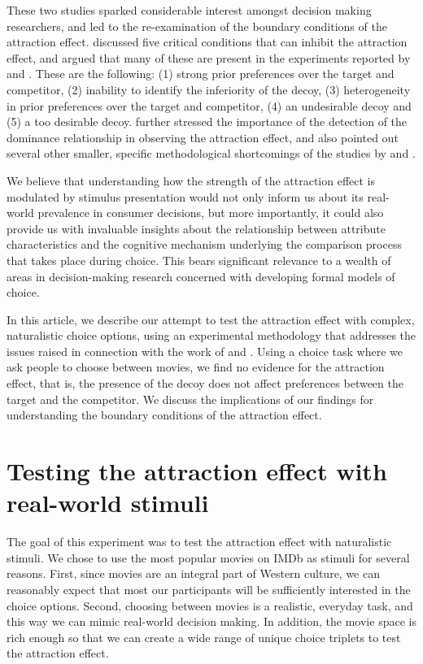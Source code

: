 \documentclass[12pt, a4paper]{article}
\begin{document}
These two studies sparked considerable interest amongst decision making researchers, and led to the re-examination of the boundary conditions of the attraction effect.  discussed five critical conditions that can inhibit the attraction effect, and argued that many of these are present in the experiments reported by \citeauthor{Frederick2014} and \citeauthor{Yang2014}. These are the following: (1) strong prior preferences over the target and competitor, (2) inability to identify the inferiority of the decoy, (3) heterogeneity in prior preferences over the target and competitor, (4) an undesirable decoy and (5) a too desirable decoy.  further stressed the importance of the detection of the dominance relationship in observing the attraction effect, and also pointed out several other smaller, specific methodological shortcomings of the studies by \citeauthor{Frederick2014} and \citeauthor{Yang2014}.

We believe that understanding how the strength of the attraction effect is modulated by stimulus presentation would not only inform us about its real-world prevalence in consumer decisions, but more importantly, it could also provide us with invaluable insights about the relationship between attribute characteristics and the cognitive mechanism underlying the comparison process that takes place during choice. This bears significant relevance to a wealth of areas in decision-making research concerned with developing formal models of choice.

In this article, we describe our attempt to test the attraction effect with complex, naturalistic choice options, using an experimental methodology that addresses the issues raised in connection with the work of \citeauthor{Frederick2014} and \citeauthor{Yang2014}. Using a choice task where we ask people to choose between movies, we find no evidence for the attraction effect, that is, the presence of the decoy does not affect preferences between the target and the competitor. We discuss the implications of our findings for understanding the boundary conditions of the attraction effect.

\section{Testing the attraction effect with real-world stimuli}

The goal of this experiment was to test the attraction effect with naturalistic stimuli. We chose to use the most popular movies on IMDb as stimuli for several reasons. First, since movies are an integral part of Western culture, we can reasonably expect that most our participants will be sufficiently interested in the choice options. Second, choosing between movies is a realistic, everyday task, and this way we can mimic real-world decision making. In addition, the movie space is rich enough so that we can create a wide range of unique choice triplets to test the attraction effect.
\end{document}
